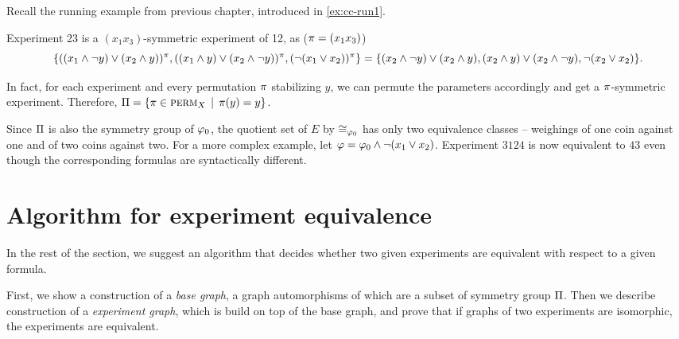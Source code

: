 \begin{example}
Recall the running example from previous chapter, introduced in \autoref{ex:cc-run1}.

Experiment 23 is a $(x_1x_3)$-symmetric experiment of 12, as ($\pi = (x_1x_3)$)
\[
\{ ((x_1 \wedge \neg y) \vee (x_2\wedge y))^\pi,
   ((x_1 \wedge y) \vee (x_2\wedge\neg y))^\pi,
   (\neg (x_1  \vee x_2))^\pi \} =
\{ (x_2 \wedge \neg y) \vee (x_2\wedge y),
   (x_2 \wedge y) \vee (x_2\wedge\neg y),
   \neg (x_2 \vee x_2) \}.
\]

In fact, for each experiment and every permutation $\pi$ stabilizing $y$,
  we can permute the parameters accordingly and get a $\pi$-symmetric experiment.
Therefore, $\Pi = \{\pi\in\textsc{perm}_X \:\:|\:\: \pi(y) = y\}$.

Since $\Pi$ is also the symmetry group of $\varphi_0$, the quotient set of $E$
   by $\cong_{\varphi_0}$ has only two equivalence classes --
   weighings of one coin against one and of two coins against two.
For a more complex example, let $\varphi = \varphi_0\wedge\neg(x_1\vee x_2)$.
Experiment $3124$ is now equivalent to $43$ even though the corresponding formulas
  are syntactically different.
\end{example}

\section{Algorithm for experiment equivalence}

In the rest of the section, we suggest an algorithm that decides
  whether two given experiments are equivalent with respect to a given formula.

First, we show a construction of a \emph{base graph}, a graph automorphisms of which are a subset of
  symmetry group $\Pi$.
Then we describe construction of a \emph{experiment graph}, which is build on top of the base graph, and prove
  that if graphs of two experiments are isomorphic, the experiments are equivalent.

